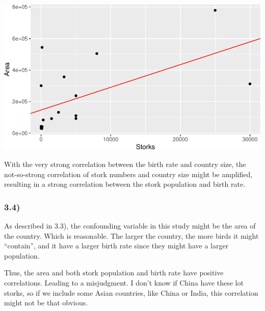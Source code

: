 \documentclass[
]{article}
\begin{document}
\begin{center}\includegraphics{Homework7_files/figure-latex/unnamed-chunk-20-1} \end{center}

With the very strong correlation between the birth rate and country
size, the not-so-strong correlation of stork numbers and country size
might be amplified, resulting in a strong correlation between the stork
population and birth rate.

\hypertarget{section-12}{%
\subsubsection{3.4)}\label{section-12}}

As described in 3.3), the confounding variable in this study might be
the area of the country. Which is reasonable. The larger the country,
the more birds it might ``contain'', and it have a larger birth rate
since they might have a larger population.

Thus, the area and both stork population and birth rate have positive
correlations. Leading to a misjudgment. I don't know if China have these
lot storks, so if we include some Asian countries, like China or India,
this correlation might not be that obvious.
\end{document}
